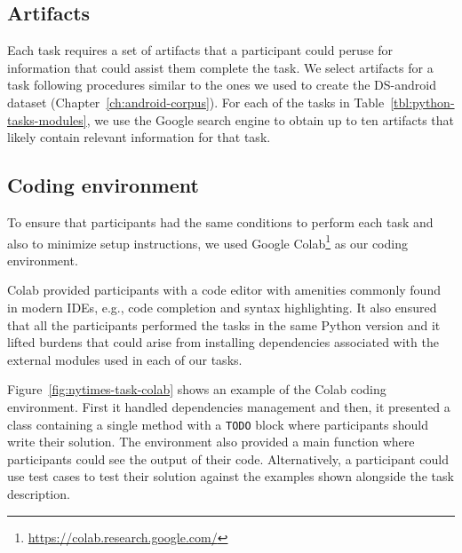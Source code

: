 







\subsection{Artifacts}
\label{cp6:experiment-artifacts}


Each task requires a set of artifacts that a participant could peruse for information that could assist them complete the task.
We select artifacts for a task following procedures similar to the ones we used to create the \acs{DS-android} dataset (Chapter~\ref{ch:android-corpus}). 
For each of the tasks in Table~\ref{tbl:python-tasks-modules}, we use the Google search engine to obtain up to ten artifacts that likely contain relevant
information for that task. 







\subsection{Coding environment}
\label{cp6:coding-environment}






To ensure that participants had the same conditions to perform each task
and also to minimize setup instructions, we used Google Colab\footnote{\url{https://colab.research.google.com/}} as our coding environment. 






Colab provided participants with a code editor with amenities commonly found in modern IDEs, e.g., code completion and syntax highlighting. It also ensured that all the participants 
performed the tasks in the same Python version and it lifted 
burdens that could arise from installing dependencies associated with the external modules used in each of our tasks. 



Figure~\ref{fig:nytimes-task-colab} shows an example of the Colab coding environment. 
First it handled dependencies management and then, 
it presented a class containing a single method with a \texttt{TODO} block where 
participants should write their solution. 
The environment also provided a main function where participants could see the output
of their code. Alternatively, a participant could use test cases to test their solution
against the examples shown alongside the task description.





